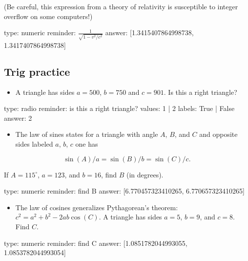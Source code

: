 \documentclass[12pt]{article}
\begin{document}
(Be careful, this expression from a theory of relativity is susceptible
to integer overflow on some computers!)

\begin{answer}
    type: numeric
    reminder: \( \frac{1}{\sqrt{1 - v^2/c^2}} \)
    answer: [1.3415407864998738, 1.3417407864998738]

\end{answer}

\subsection{Trig practice}

\begin{itemize}
\itemsep1pt\parskip0pt
\item
  A triangle has sides $a=500$, $b=750$ and $c=901$. Is this a right
  triangle?
\end{itemize}

\begin{answer}
type: radio
reminder: is this a right triangle?
values: 1 | 2
labels: True | False
answer: 2
\end{answer}

\begin{itemize}
\itemsep1pt\parskip0pt
\item
  The law of sines states for a triangle with angle $A$, $B$, and $C$
  and opposite sides labeled $a$, $b$, $c$ one has
\end{itemize}

\[ 
\sin(A)/a = \sin(B)/b = \sin(C)/c.
\]

If $A=115^\circ$, $a=123$, and $b=16$, find $B$ (in degrees).

\begin{answer}
    type: numeric
    reminder: find B
    answer: [6.770457323410265, 6.770657323410265]

\end{answer}

\begin{itemize}
\itemsep1pt\parskip0pt
\item
  The law of cosines generalizes Pythagorean's theorem:
  $c^2 = a^2 +   b^2 - 2ab \cos(C)$. A triangle has sides $a=5$, $b=9$,
  and $c=8$. Find $C$.
\end{itemize}

\begin{answer}
    type: numeric
    reminder: find C
    answer: [1.0851782044993055, 1.0853782044993054]

\end{answer}
\end{document}

